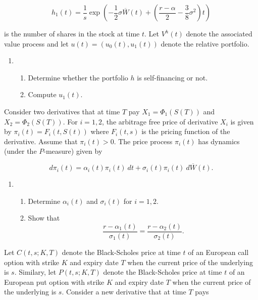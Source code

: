 \documentclass[a4paper,12pt,openany]{book}
\providecommand{\tightlist}{%
 \setlength{\itemsep}{0pt}\setlength{\parskip}{0pt}}
\begin{document}
\[
h_1(t)=\frac{1}{s}\exp\left(-\frac{1}{2}\sigma\overline{W}(t)+\left(\frac{r-\alpha}{2}-\frac{3}{8}\sigma^2\right)t\right)
\]

is the number of shares in the stock at time \(t\). Let \(V^h(t)\) denote the associated value process and let \(u(t)=\left(u_0(t),u_1(t)\right)\) denote the relative portfolio.

\begin{enumerate}
\def\labelenumi{\alph{enumi}.}
\item
  \begin{enumerate}
  \def\labelenumii{\roman{enumii}.}
  \tightlist
  \item
    Determine whether the portfolio \(h\) is self-financing or not.
  \item
    Compute \(u_1(t)\).
  \end{enumerate}
\end{enumerate}

Consider two derivatives that at time \(T\) pay \(X_1=\Phi_1(S(T))\) and \(X_2=\Phi_2(S(T))\). For \(i=1,2\), the arbitrage free price of derivative \(X_i\) is given by \(\pi_i(t)=F_i(t,S(t))\) where \(F_i(t,s)\) is the pricing function of the derivative. Assume that \(\pi_i(t)>0\). The price process \(\pi_i(t)\) has dynamics (under the \(P\)-measure) given by

\[
d\pi_i(t)=\alpha_i(t)\pi_i(t)\ dt+\sigma_i(t)\pi_i(t)\ d\overline{W}(t).
\]

\begin{enumerate}
\def\labelenumi{\alph{enumi}.}
\setcounter{enumi}{1}
\item
  \begin{enumerate}
  \def\labelenumii{\roman{enumii}.}
  \tightlist
  \item
    Determine \(\alpha_i(t)\) and \(\sigma_i(t)\) for \(i=1,2\).
  \item
    Show that
    \[
    \frac{r-\alpha_1(t)}{\sigma_1(t)}=\frac{r-\alpha_2(t)}{\sigma_2(t)}.
    \]
  \end{enumerate}
\end{enumerate}

Let \(C(t,s;K,T)\) denote the Black-Scholes price at time \(t\) of an European call option with strike \(K\) and expiry date \(T\) when the current price of the underlying is \(s\). Similary, let \(P(t,s;K,T)\) denote the Black-Scholes price at time \(t\) of an European put option with strike \(K\) and expiry date \(T\) when the current price of the underlying is \(s\). Consider a new derivative that at time \(T\) pays
\end{document}
